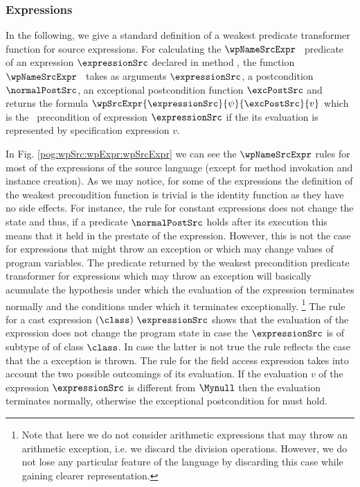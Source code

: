\subsubsection{Expressions}\label{pog:wpSrc:wpExpr}
In the following, we  give a standard  definition of a weakest
predicate transformer function for source expressions. %
For calculating the  $\wpNameSrcExpr$ \ predicate  of  an expression $\expressionSrc$ declared in method \methodd,
 the function $\wpNameSrcExpr$ \ takes as arguments  $\expressionSrc$, a postcondition $\normalPostSrc$, an exceptional postcondition 
function $\excPostSrc$  and 
  returns the    formula 
$\wpSrcExpr{\expressionSrc}{\psi}{\excPostSrc}{ v }$ which is the \wpName \ precondition of expression $\expressionSrc$ 
if the its evaluation is represented by  specification expression $v$.  

In Fig. \ref{pog:wpSrc:wpExpr:wpSrcExpr} we can see the $\wpNameSrcExpr$ rules for  most of the expressions of the source language (except for method invokation 
and instance creation). As we may notice, for some of the expressions   
the definition of the weakest precondition function is trivial is the identity function
 as they have  no side effects. For instance, the rule for constant expressions does not change the state and thus,
 if a predicate $ \normalPostSrc$ holds
 after its execution this means that it held in the prestate of the expression. 
 However, this is not the case for expressions that might throw an exception or which may change values of program variables.
 The predicate returned by the weakest precondition predicate transformer for expressions which may throw an exception 
will basically acumulate the hypothesis under which the evaluation 
of the expression terminates normally and the  conditions under which it  terminates exceptionally.
\footnote{Note that here we do not consider arithmetic expressions that may throw
an arithmetic exception, i.e. we discard the division operations.
 However,   we do not lose any particular feature of the language by discarding this case 
while gaining clearer representation.} The rule for a cast expression $( \class ) \ \expressionSrc$ shows that the evaluation of the expression
does not change the program state in case the $ \expressionSrc$ is of subtype of of class  $\class$. In case the latter is not true 
the rule reflects the case that the a  \ClassCastExc{} exception is thrown. The rule for the field access expression takes into account
the two possible  outcomings of its evaluation. If the evaluation $v$ of the expression $\expressionSrc$ 
is different from $\Mynull$ then the evaluation terminates normally, otherwise the exceptional postcondition  
for \NullPointerExc{}  must hold.

